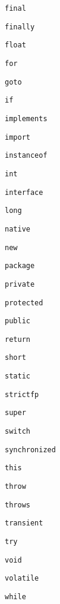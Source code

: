 \documentclass[11pt]{article}
\begin{document}
\begin{description}
\begin{multicols}{5}
                  \texttt{final}

                  \texttt{finally}

                  \texttt{float}

                  \texttt{for}

                  \texttt{goto}

                  \texttt{if}

                  \texttt{implements}

                  \texttt{import}

                  \texttt{instanceof}

                  \texttt{int}

                  \texttt{interface}

                  \texttt{long}

                  \texttt{native}

                  \texttt{new}

                  \texttt{package}

                  \texttt{private}

                  \texttt{protected}

                  \texttt{public}

                  \texttt{return}

                  \texttt{short}

                  \texttt{static}

                  \texttt{strictfp}

                  \texttt{super}

                  \texttt{switch}

                  \texttt{synchronized}

                  \texttt{this}

                  \texttt{throw}

                  \texttt{throws}

                  \texttt{transient}

                  \texttt{try}

                  \texttt{void}

                  \texttt{volatile}

                  \texttt{while}

                \end{multicols}

                \vspace{-2.5mm}


\end{description}
\end{document}
